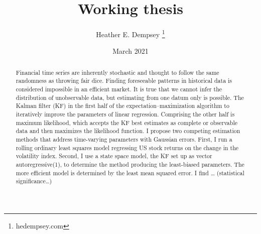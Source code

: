 \documentclass[12pt, letterpaper, twoside]{article}
\title{Working thesis}
\author{Heather E. Dempsey \thanks{hedempsey.com}}
\date{March 2021}
\begin{document}
\begin{titlepage}
\maketitle
\end{titlepage}

\begin{abstract}
Financial time series are inherently stochastic and thought to follow the same randomness as throwing fair dice. Finding foreseeable patterns in historical data is considered impossible in an efficient market. It is true that we cannot infer the distribution of unobservable data, but estimating from one datum only is possible. The Kalman filter (KF) in the first half of the expectation–maximization algorithm to iteratively improve the parameters of linear regression. Comprising the other half is maximum likelihood, which accepts the KF best estimates as complete or observable data and then maximizes the likelihood function. I propose two competing estimation methods that address time-varying parameters with Gaussian errors. First, I run a rolling ordinary least squares model regressing US stock returns on the change in the volatility index. Second, I use a state space model, the KF set up as vector autoregressive(1), to determine the method producing the least-biased parameters. The more efficient model is determined by the least mean squared error. I find … (statistical significance…)


\end{abstract}
\end{document}
